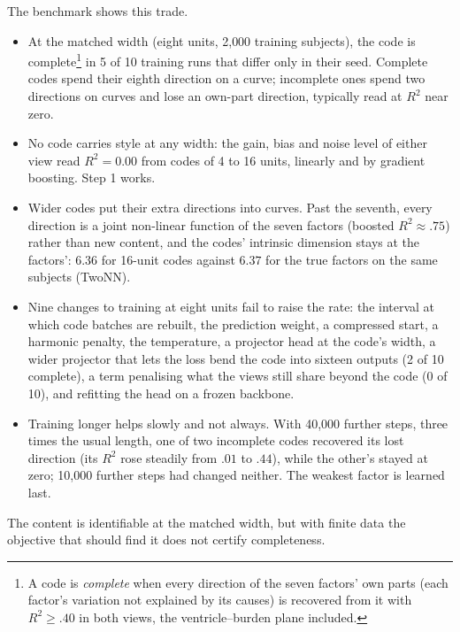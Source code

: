 The benchmark shows this trade. %
\begin{itemize}
\item At the matched width (eight units, 2{,}000 training subjects), the code is
  complete\footnote{A code is \emph{complete} when every direction of the seven
  factors' own parts (each factor's variation not explained by its causes) is
  recovered from it with $R^2 \geq .40$ in both views, the ventricle--burden
  plane included. } in 5
  of 10 training runs that differ only in their seed. %
  Complete codes spend their eighth direction on a curve; incomplete ones spend
  two directions on curves and lose an own-part direction, typically read at
  $R^2$ near zero. %
\item No code carries style at any width: the gain, bias and noise level of
  either view read $R^2 = 0.00$ from codes of 4 to 16 units, linearly and by
  gradient boosting. Step 1 works. %
\item Wider codes put their extra directions into curves. Past the seventh,
  every direction is a joint non-linear function of the seven factors (boosted
  $R^2 \approx .75$) rather than new content, and the codes' intrinsic dimension
  stays at the factors': $6.36$ for 16-unit codes against $6.37$ for the true
  factors on the same subjects (TwoNN). %
\item Nine changes to training at eight units fail to raise the rate: the
  interval at which code batches are rebuilt, the prediction weight, a
  compressed start, a harmonic penalty, the temperature, a projector head at the
  code's width, a wider projector that lets the loss bend the code into sixteen
  outputs (2 of 10 complete), a term penalising what the views still share
  beyond the code (0 of 10), and refitting the head on a frozen backbone.
\item Training longer helps slowly and not always. With 40{,}000 further steps,
  three times the usual length, one of two incomplete codes recovered its lost
  direction (its $R^2$ rose steadily from $.01$ to $.44$), while the other's
  stayed at zero; 10{,}000 further steps had changed neither. The weakest factor
  is learned last.
\end{itemize}
The content is identifiable at the matched width, but with finite data the
objective that should find it does not certify completeness.

